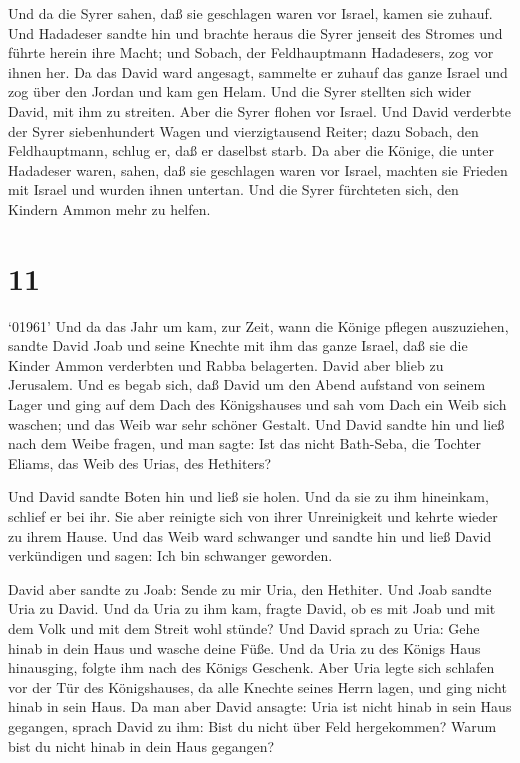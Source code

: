  Und da die Syrer sahen, daß sie geschlagen waren vor
Israel, kamen sie zuhauf.  Und Hadadeser sandte hin und
brachte heraus die Syrer jenseit des Stromes und führte herein ihre
Macht; und Sobach, der Feldhauptmann Hadadesers, zog vor ihnen her.
 Da das David ward angesagt, sammelte er zuhauf das ganze
Israel und zog über den Jordan und kam gen Helam. Und die Syrer stellten
sich wider David, mit ihm zu streiten.  Aber die Syrer
flohen vor Israel. Und David verderbte der Syrer siebenhundert Wagen und
vierzigtausend Reiter; dazu Sobach, den Feldhauptmann, schlug er, daß er
daselbst starb.  Da aber die Könige, die unter Hadadeser
waren, sahen, daß sie geschlagen waren vor Israel, machten sie Frieden
mit Israel und wurden ihnen untertan. Und die Syrer fürchteten sich, den
Kindern Ammon mehr zu helfen.

\hypertarget{section-10}{%
\section{11}\label{section-10}}

 `01961' Und da das Jahr um kam, zur Zeit, wann die Könige
pflegen auszuziehen, sandte David Joab und seine Knechte mit ihm das
ganze Israel, daß sie die Kinder Ammon verderbten und Rabba belagerten.
David aber blieb zu Jerusalem.  Und es begab sich, daß David
um den Abend aufstand von seinem Lager und ging auf dem Dach des
Königshauses und sah vom Dach ein Weib sich waschen; und das Weib war
sehr schöner Gestalt.  Und David sandte hin und ließ nach
dem Weibe fragen, und man sagte: Ist das nicht Bath-Seba, die Tochter
Eliams, das Weib des Urias, des Hethiters?

 Und David sandte Boten hin und ließ sie holen. Und da sie
zu ihm hineinkam, schlief er bei ihr. Sie aber reinigte sich von ihrer
Unreinigkeit und kehrte wieder zu ihrem Hause.  Und das Weib
ward schwanger und sandte hin und ließ David verkündigen und sagen: Ich
bin schwanger geworden.

 David aber sandte zu Joab: Sende zu mir Uria, den Hethiter.
Und Joab sandte Uria zu David.  Und da Uria zu ihm kam,
fragte David, ob es mit Joab und mit dem Volk und mit dem Streit wohl
stünde?  Und David sprach zu Uria: Gehe hinab in dein Haus
und wasche deine Füße. Und da Uria zu des Königs Haus hinausging, folgte
ihm nach des Königs Geschenk.  Aber Uria legte sich schlafen
vor der Tür des Königshauses, da alle Knechte seines Herrn lagen, und
ging nicht hinab in sein Haus.  Da man aber David ansagte:
Uria ist nicht hinab in sein Haus gegangen, sprach David zu ihm: Bist du
nicht über Feld hergekommen? Warum bist du nicht hinab in dein Haus
gegangen?

